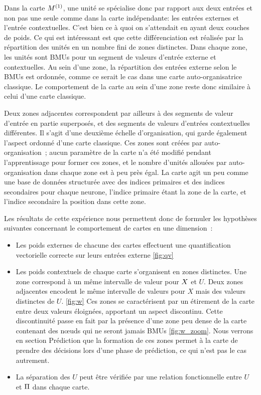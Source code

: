 \documentclass[../main]{subfiles}
\begin{document}
Dans la carte $M^{({1})}$, une unité se spécialise donc par rapport aux deux entrées et non pas une seule comme dans la carte indépendante: les entrées externes et l'entrée contextuelles. C'est bien ce à quoi on s'attendait en ayant deux couches de poids. Ce qui est intéressant est que cette différenciation est réalisée par la répartition des unités en un nombre fini de zones distinctes. Dans chaque zone, les unités sont BMUs pour un segment de valeurs d'entrée externe et contextuelles. Au sein d'une zone, la répartition des entrées externe selon le BMUs est ordonnée, comme ce serait le cas dans une carte auto-organisatrice classique. Le comportement de la carte au sein d'une zone reste donc similaire à celui d'une carte classique.

Deux zones adjacentes correspondent par ailleurs à des segments de valeur d'entrée en partie superposés, et des segments de valeurs d'entrées contextuelles différentes. Il s'agit d'une deuxième échelle d'organisation, qui garde également l'aspect ordonné d'une carte classique. Ces zones sont créées par auto-organisation~; aucun paramètre de la carte n'a été modifié pendant l'apprentissage pour former ces zones, et le nombre d'unités allouées par auto-organisation dans chaque zone est à peu près égal. La carte agit un peu comme une base de données structurée avec des indices primaires et des indices secondaires pour chaque neurone, l'indice primaire étant la zone de la carte, et l'indice secondaire la position dans cette zone.


Les résultats de cette expérience nous permettent donc de formuler les hypothèses suivantes concernant le comportement de cartes en une dimension~:

\begin{itemize}
	\item Les poids externes de chacune des cartes effectuent une quantification vectorielle correcte sur leurs entrées externe \ref{fig:qv}
	\item Les poids contextuels de chaque carte s'organisent en zones distinctes. Une zone correspond à un même intervalle de valeur pour $X$ et $U$. Deux zones adjacentes encodent le même intervalle de valeurs pour $X$ mais des valeurs distinctes de $U$. \ref{fig:w} Ces zones se caractérisent par un étirement de la carte entre deux valeurs éloignées, apportant un aspect discontinu. Cette discontinuité passe en fait par la présence d'une zone peu dense de la carte contenant des n\oe{}uds qui ne seront jamais BMUs \ref{fig:w_zoom}. Nous verrons en section Prédiction que la formation de ces zones permet à la carte de prendre des décisions lors d'une phase de prédiction, ce qui n'est pas le cas autrement.
	\item La séparation des $U$ peut être vérifiée par une relation fonctionnelle entre $U$ et $\Pi$ dans chaque carte.
\end{itemize}
\end{document}
